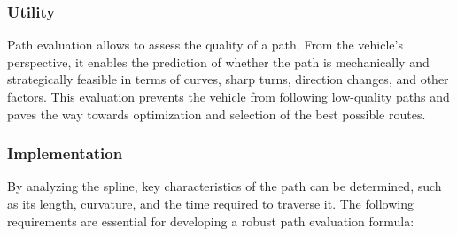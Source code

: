 \subsubsection{Utility}
Path evaluation allows to assess the quality of a path. From the vehicle's perspective, it enables the 
prediction of whether the path is mechanically and strategically feasible in terms of curves, sharp turns, direction 
changes, and other factors. This evaluation prevents the vehicle from following low-quality paths and paves the way 
towards optimization and selection of the best possible routes.

\subsubsection{Implementation}
By analyzing the spline,  key characteristics of the path can be determined, such as its length, curvature, and 
the time required to traverse it. The following requirements are essential for developing a robust path 
evaluation formula:
